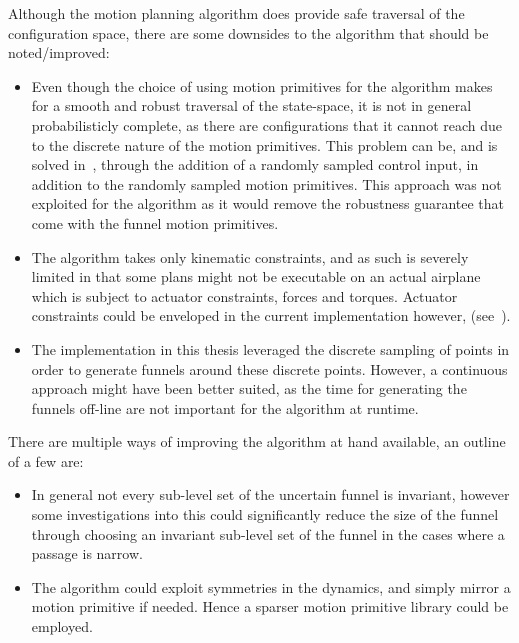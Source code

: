 Although the \rrtfunnel{} motion planning algorithm does provide safe traversal
of the configuration space, there are some downsides to the algorithm that
should be noted/improved:
\begin{itemize}

\item Even though the choice of using motion primitives for the \rrtfunnel{}
  algorithm makes for a smooth and robust traversal of the state-space, it is
  not in general probabilisticly complete, as there are configurations that it
  cannot reach due to the discrete nature of the motion primitives. This problem
  can be, and is solved in~\cite{vonasekGlobalMotionPlanning2013}, through the
  addition of a randomly sampled control input, in addition to the randomly
  sampled motion primitives. This approach was not exploited for the
  \rrtfunnel{} algorithm as it would remove the robustness guarantee that come
  with the funnel motion primitives.

\item The algorithm takes only kinematic constraints, and as such is severely
  limited in that some plans might not be executable on an actual airplane which
  is subject to actuator constraints, forces and torques. Actuator constraints
  could be enveloped in the current implementation however,
  (see~\cite[sec.4.3.3]{majumdarFunnelLibrariesRealtime2017}).

\item The implementation in this thesis leveraged the discrete sampling of
  points in order to generate funnels around these discrete points. However, a
  continuous approach might have been better suited, as the time for generating
  the funnels off-line are not important for the algorithm at runtime.

\end{itemize}

There are multiple ways of improving the algorithm at hand available, an outline
of a few are:

\begin{itemize}

  \item In general not every sub-level set of the uncertain funnel is invariant,
  however some investigations into this could significantly reduce the size of
  the funnel through choosing an invariant sub-level set of the funnel in the
  cases where a passage is narrow.

\item The algorithm could exploit symmetries in the dynamics, and simply mirror
  a motion primitive if needed. Hence a sparser motion primitive library could
  be employed.

\end{itemize}



